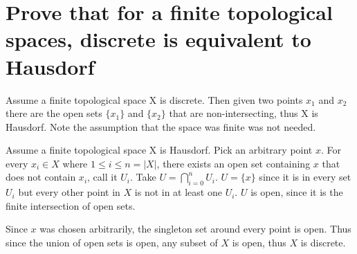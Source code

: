 \documentclass{article}
\begin{document}
\section{Prove that for a finite topological spaces, discrete is equivalent to Hausdorf}

Assume a finite topological space X is discrete. Then given two points $x_1$ and $x_2$ there are the open sets $\{x_1\}$ and $\{x_2\}$ that are non-intersecting, thus X is Hausdorf. Note the assumption that the space was finite was not needed.

Assume a finite topological space X is Hausdorf. Pick an arbitrary point $x$. For every $x_i \in X$ where $1 \le i \le n=|X|$, there exists an open set containing $x$ that does not contain $x_i$, call it $U_i$. Take $U=\bigcap_{i=0}^n U_i$. $U = \{x\}$ since it is in every set $U_i$ but every other point in $X$ is not in at least one $U_i$. $U$ is open, since it is the finite intersection of open sets.

Since $x$ was chosen arbitrarily, the singleton set around every point is open. Thus since the union of open sets is open, any subset of $X$ is open, thus $X$ is discrete.
\end{document}
